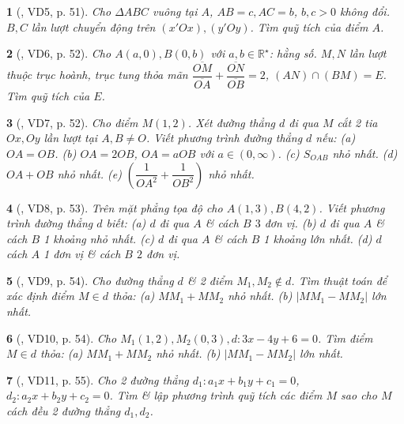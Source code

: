 \documentclass{article}
\newtheorem{baitoan}{}
\begin{document}
\begin{baitoan}[\cite{Hai_Hung_Thu_Tung_ncpt_Toan_10_tap_2}, VD5, p. 51]
	Cho $\Delta ABC$ vuông tại $A$, $AB = c,AC = b$, $b,c > 0$ không đổi. $B,C$ lần lượt chuyển động trên $(x'Ox),(y'Oy)$. Tìm quỹ tích của điểm $A$.
\end{baitoan}

\begin{baitoan}[\cite{Hai_Hung_Thu_Tung_ncpt_Toan_10_tap_2}, VD6, p. 52]
	Cho $A(a,0),B(0,b)$ với $a,b\in\mathbb{R}^\star$: hằng số. $M,N$ lần lượt thuộc trục hoành, trục tung thỏa mãn $\dfrac{\overline{OM}}{\overline{OA}} + \dfrac{\overline{ON}}{\overline{OB}} = 2$, $(AN)\cap(BM) = E$. Tìm quỹ tích của $E$.
\end{baitoan}

\begin{baitoan}[\cite{Hai_Hung_Thu_Tung_ncpt_Toan_10_tap_2}, VD7, p. 52]
	Cho điểm $M(1,2)$. Xét đường thẳng $d$ đi qua $M$ cắt 2 tia $Ox,Oy$ lần lượt tại $A,B\ne O$. Viết phương trình đường thẳng $d$ nếu: (a) $OA = OB$. (b) $OA = 2OB$, $OA = aOB$ với $a\in(0,\infty)$. (c) $S_{OAB}$ nhỏ nhất. (d) $OA + OB$ nhỏ nhất. (e) $\left(\dfrac{1}{OA^2} + \dfrac{1}{OB^2}\right)$ nhỏ nhất.
\end{baitoan}

\begin{baitoan}[\cite{Hai_Hung_Thu_Tung_ncpt_Toan_10_tap_2}, VD8, p. 53]
	Trên mặt phẳng tọa độ cho $A(1,3),B(4,2)$. Viết phương trình đường thẳng $d$ biết: (a) $d$ đi qua $A$ \& cách $B$ $3$ đơn vị. (b) $d$ đi qua $A$ \& cách $B$ 1 khoảng nhỏ nhất. (c) $d$ đi qua $A$ \& cách $B$ 1 khoảng lớn nhất. (d) $d$ cách $A$ 1 đơn vị \& cách $B$ $2$ đơn vị.
\end{baitoan}

\begin{baitoan}[\cite{Hai_Hung_Thu_Tung_ncpt_Toan_10_tap_2}, VD9, p. 54]
	Cho đường thẳng $d$ \& 2 điểm $M_1,M_2\notin d$. Tìm thuật toán để xác định điểm $M\in d$ thỏa: (a) $MM_1 + MM_2$ nhỏ nhất. (b) $|MM_1 - MM_2|$ lớn nhất.
\end{baitoan}

\begin{baitoan}[\cite{Hai_Hung_Thu_Tung_ncpt_Toan_10_tap_2}, VD10, p. 54]
	Cho $M_1(1,2),M_2(0,3),d:3x - 4y + 6 = 0$. Tìm điểm $M\in d$ thỏa: (a) $MM_1 + MM_2$ nhỏ nhất. (b) $|MM_1 - MM_2|$ lớn nhất.
\end{baitoan}

\begin{baitoan}[\cite{Hai_Hung_Thu_Tung_ncpt_Toan_10_tap_2}, VD11, p. 55]
	Cho 2 đường thẳng $d_1:a_1x + b_1y + c_1 = 0$, $d_2:a_2x + b_2y + c_2 = 0$. Tìm \& lập phương trình quỹ tích các điểm $M$ sao cho $M$ cách đều 2 đường thẳng $d_1,d_2$.
\end{baitoan}
\end{document}
